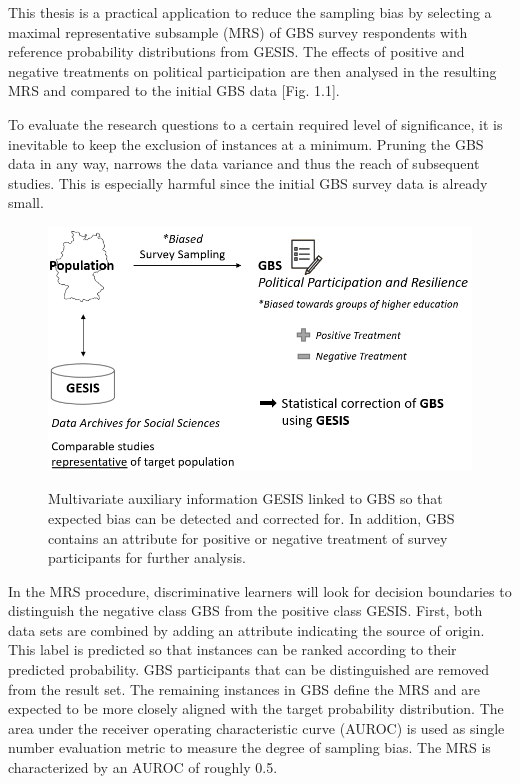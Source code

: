This thesis is a practical application to reduce the sampling bias by selecting a maximal representative subsample (MRS) of GBS survey respondents with reference probability distributions from GESIS. The effects of positive and negative treatments on political participation are then analysed in the resulting MRS and compared to the initial GBS data [Fig. 1.1].

To evaluate the research questions to a certain required level of significance, it is inevitable to keep the exclusion of instances at a minimum. Pruning the GBS data in any way, narrows the data variance and thus the reach of subsequent studies. This is especially harmful since the initial GBS survey data is already small.

\vspace{20pt}
\begin{figure}[ht]
	\begin{center}
		\includegraphics[scale=0.60,angle=0]{fig/overview}
		\label{project}
		\caption{Multivariate auxiliary information GESIS linked to GBS so that expected bias can be detected and corrected for. In addition, GBS contains an attribute for positive or negative treatment of survey participants for further analysis.}
	\end{center}
\end{figure}

In the MRS procedure, discriminative learners will look for decision boundaries to distinguish the negative class GBS from the positive class GESIS. First, both data sets are combined by adding an attribute indicating the source of origin. This label is predicted so that instances can be ranked according to their predicted probability. GBS participants that can be distinguished are removed from the result set. The remaining instances in GBS define the MRS and are expected to be more closely aligned with the target probability distribution.  The area under the receiver operating characteristic curve (AUROC) is used as single number evaluation metric to measure the degree of sampling bias. The MRS is characterized by an AUROC of roughly 0.5.

